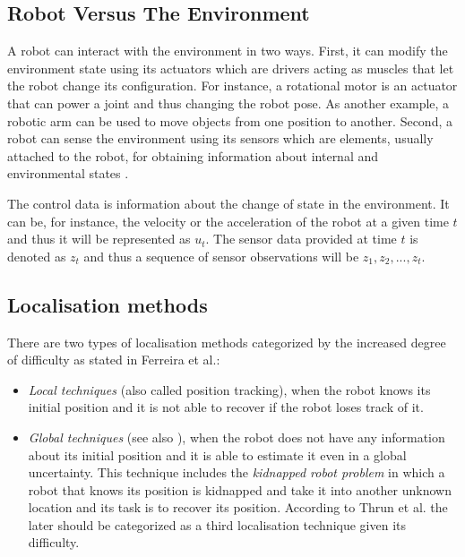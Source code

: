 \subsection{Robot Versus The Environment}

A robot can interact with the environment in two ways. First, it can modify the environment state using its actuators which are drivers acting as muscles that let the robot change its configuration\cite{Reza:Theory-of-applied-robotics}. For instance, a rotational motor is an actuator that can power a joint and thus changing the robot pose. As another example, a robotic arm can be used to move objects from one position to another. Second, a robot can sense the environment using its sensors which are elements, usually attached to the robot, for obtaining information about internal and environmental states \cite{Reza:Theory-of-applied-robotics} \cite{Thrun:2005:PR:1121596}. 

The control data is information about the change of state in the environment\cite{Thrun:2005:PR:1121596}. It can be, for instance, the velocity or the acceleration of the robot at a given time $t$ and thus it will be represented as $u_t$.  The sensor data provided at time $t$ is denoted as $z_t$ and thus a sequence of sensor observations will be $z_1, z_2, ..., z_t$.

\subsection{Localisation methods}

There are two types of localisation methods categorized by the increased degree of difficulty as stated in Ferreira et al.\cite{Ferreira:prob}: 

\begin{itemize}
\item \textit{Local techniques} (also called position tracking\cite{Thrun:2005:PR:1121596}), when the robot knows its initial position and it is not able to recover if the robot loses track of it.
\item \textit{Global techniques} (see also \cite{Feng:where-am-I}), when the robot does not have any information about its initial position and it is able to estimate it even in a global uncertainty. This technique includes the \textit{kidnapped robot problem} in which a robot that knows its position is kidnapped and take it into another unknown location and its task is to recover its position. According to Thrun et al.\cite{Thrun:2005:PR:1121596} the later should be categorized as a third localisation technique given its difficulty.
\end{itemize}

